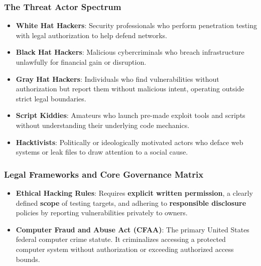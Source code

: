 \documentclass[12pt,openany]{book}
\begin{document}
\subsubsection*{The Threat Actor Spectrum}


\begin{itemize}

  \item \textbf{White Hat Hackers}: Security professionals who perform penetration testing with legal authorization to help defend networks.

  \item \textbf{Black Hat Hackers}: Malicious cybercriminals who breach infrastructure unlawfully for financial gain or disruption.

  \item \textbf{Gray Hat Hackers}: Individuals who find vulnerabilities without authorization but report them without malicious intent, operating outside strict legal boundaries.

  \item \textbf{Script Kiddies}: Amateurs who launch pre-made exploit tools and scripts without understanding their underlying code mechanics.

  \item \textbf{Hacktivists}: Politically or ideologically motivated actors who deface web systems or leak files to draw attention to a social cause.

\end{itemize}


\subsubsection*{Legal Frameworks and Core Governance Matrix}


\begin{itemize}

  \item \textbf{Ethical Hacking Rules}: Requires \textbf{explicit written permission}, a clearly defined \textbf{scope} of testing targets, and adhering to \textbf{responsible disclosure} policies by reporting vulnerabilities privately to owners.

  \item \textbf{Computer Fraud and Abuse Act (CFAA)}: The primary United States federal computer crime statute. It criminalizes accessing a protected computer system without authorization or exceeding authorized access bounds.

\end{itemize}
\end{document}
